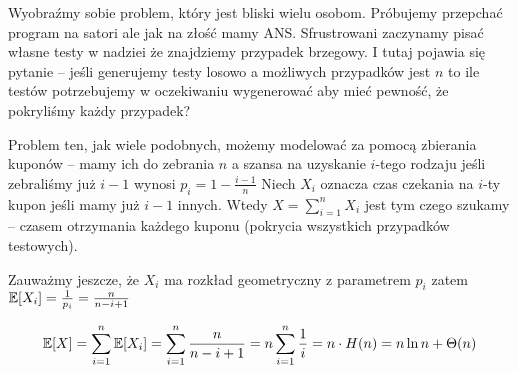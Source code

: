 Wyobraźmy sobie problem, który jest bliski wielu osobom. Próbujemy przepchać program na satori ale jak na złość mamy ANS. Sfrustrowani zaczynamy pisać własne testy w nadziei że znajdziemy przypadek brzegowy.
I tutaj pojawia się pytanie -- jeśli generujemy testy losowo a możliwych przypadków jest \( n \) to ile testów potrzebujemy w oczekiwaniu wygenerować aby mieć pewność, że pokryliśmy każdy przypadek?

Problem ten, jak wiele podobnych, możemy modelować za pomocą zbierania kuponów -- mamy ich do zebrania \( n \)
a szansa na uzyskanie \(i\)-tego rodzaju jeśli zebraliśmy już \( i - 1 \) wynosi \( p_i = 1 - \frac{i-1}{n} \) 
Niech \( X_i \) oznacza czas czekania na \(i\)-ty kupon jeśli mamy już \(i-1\) innych.
Wtedy \(X = \sum_{i=1}^n X_i\) jest tym czego szukamy -- czasem otrzymania każdego kuponu (pokrycia wszystkich przypadków testowych). 

Zauważmy jeszcze, że \( X_i \) ma rozkład geometryczny z parametrem \( p_i \) zatem \( \expected{X_i} = \frac{1}{p_i} = \frac{n}{n - i + 1} \)

\[
    \expected{X} = \sum_{i=1}^n \expected{X_i} = \sum_{i=1}^n \frac{n}{n-i+1} = n \sum_{i=1}^n \frac{1}{i}
    = n \cdot H(n) = n \ln n + \Theta(n)
\]
